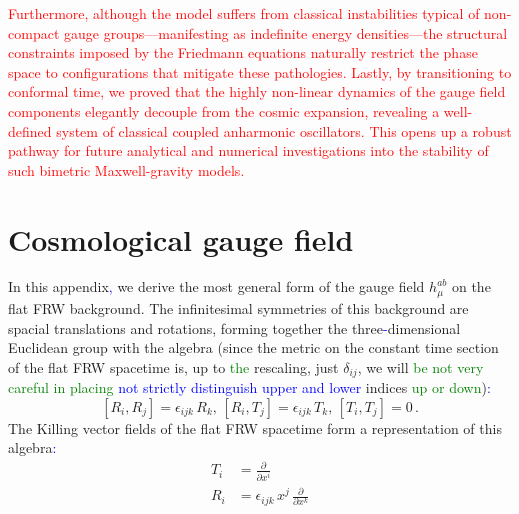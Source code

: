 \documentclass[prd,reprint,eqsecnum,nofootinbib]{revtex4-1}
\begin{document}
\textcolor{red}{
Furthermore, although the model suffers from classical instabilities typical of non-compact gauge groups---manifesting as indefinite energy densities---the structural constraints imposed by the Friedmann equations naturally restrict the phase space to configurations that mitigate these pathologies. Lastly, by transitioning to conformal time, we proved that the highly non-linear dynamics of the gauge field components elegantly decouple from the cosmic expansion, revealing a well-defined system of classical coupled anharmonic oscillators. This opens up a robust pathway for future analytical and numerical investigations into the stability of such bimetric Maxwell-gravity models.
}

\appendix*
\section{Cosmological gauge field}

In this appendix\textcolor{blue}{,} we derive the most general form of the gauge field
$h_\mu^{ab}$ on the flat FRW background. The infinitesimal
symmetries of this background are spacial translations and
rotations, forming together the three\textcolor{blue}{-}dimensional Euclidean group
with the algebra (since the metric on the constant time section of
the flat FRW spacetime is, up to \textcolor{green}{the} rescaling, just $\delta_{ij}$,
we will \textcolor{green}{be not very careful in placing} \textcolor{blue}{not strictly distinguish upper and lower} indices \textcolor{green}{up or down})\textcolor{blue}{:}
\begin{equation}\label{a1}
    [R_i, R_j] = \epsilon_{ijk}\, R_k, \, [R_i, T_j] = \epsilon_{ijk}\, T_k, \, [T_i, T_j]
    =0\, .
\end{equation}
The Killing vector fields of the flat FRW spacetime form a
representation of this algebra\textcolor{blue}{:}
\begin{align}
T_i &= \frac{\partial}{\partial x^i}\nonumber \\ R_i
&=\epsilon_{ijk}\, x^j \,\frac{\partial}{\partial x^k}\label{a2}
\end{align}
\end{document}

